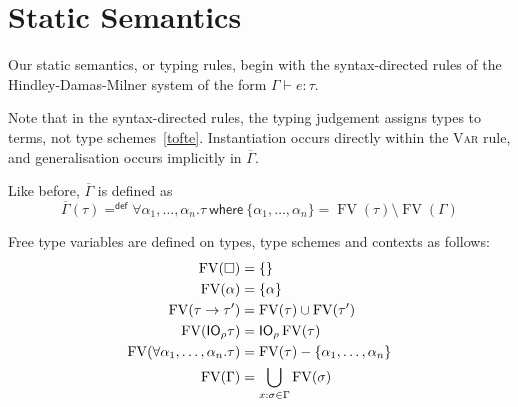 \section{Static Semantics}

Our static semantics, or typing rules, begin with the syntax-directed
rules of the Hindley-Damas-Milner system of the form $\Gamma \vdash e : \tau$.


Note that in the syntax-directed rules, the typing judgement assigns
types to terms, not type schemes~\ref{tofte}. Instantiation occurs
directly within the \textsc{Var} rule, and generalisation occurs
implicitly in $\overline{\Gamma}$.

\newcommand{\fv}{\operatorname{FV}}

Like before, $\overline{\Gamma}$ is defined as
$$ \overline{\Gamma}(\tau) =^{\textsf{def}} \forall \alpha_1, \ldots, \alpha_n . \tau \
\textsf{where} \ \{ \alpha_1, \ldots, \alpha_n \} = \fv(\tau) \setminus \fv(\Gamma)$$

Free type variables are defined on types, type schemes and contexts as
follows:
\begin{align*}
  \fv(\square) &= \{ \} \\
  \fv(\alpha) &= \{ \alpha \} \\
  \fv(\tau \rightarrow \tau') &= \fv(\tau) \cup \fv(\tau') \\
  \fv(\IO_\rho \tau) &= \IO_\rho \fv(\tau) \\
  \fv(\forall \alpha_1 , \ldots , \alpha_n . \tau) &= \fv(\tau) - \{ \alpha_1 , \ldots, \alpha_n \} \\
  \fv(\Gamma) &= \bigcup_{x : \sigma \in \Gamma} \fv(\sigma)
\end{align*}
  
